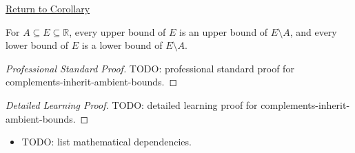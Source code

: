 \newpage
{}
\label{prf:complements-inherit-ambient-bounds}

\begin{remark*}[Return]
\hyperref[cor:complements-inherit-ambient-bounds]{Return to Corollary}
\end{remark*}

\begin{corollary*}
For $A\subseteq E\subseteq\mathbb{R}$, every upper bound of $E$ is an upper
bound of $E\setminus A$, and every lower bound of $E$ is a lower bound of
$E\setminus A$.
\end{corollary*}

\begin{proof}[Professional Standard Proof]
\LRAProofBodyStart
TODO: professional standard proof for complements-inherit-ambient-bounds.
\end{proof}

\begin{proof}[Detailed Learning Proof]
\LRAProofBodyStart
TODO: detailed learning proof for complements-inherit-ambient-bounds.
\end{proof}

\begin{remark*}
\end{remark*}

\begin{dependencies}
\begin{itemize}
  \item TODO: list mathematical dependencies.
\end{itemize}
\end{dependencies}

\clearpage
